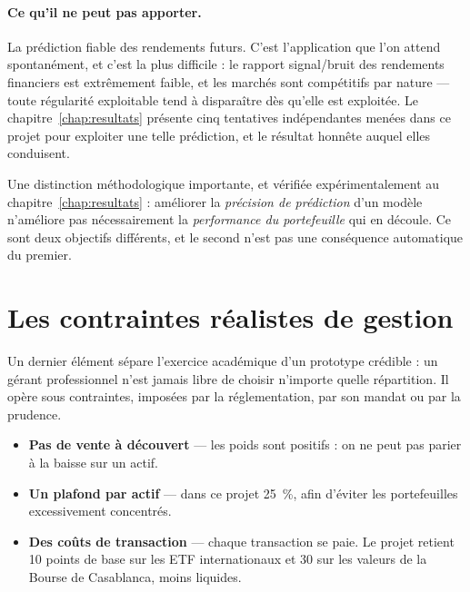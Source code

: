 \paragraph{Ce qu'il ne peut pas apporter.} La prédiction fiable des rendements
futurs. C'est l'application que l'on attend spontanément, et c'est la plus
difficile : le rapport signal/bruit des rendements financiers est extrêmement
faible, et les marchés sont compétitifs par nature — toute régularité exploitable
tend à disparaître dès qu'elle est exploitée. Le chapitre~\ref{chap:resultats}
présente cinq tentatives indépendantes menées dans ce projet pour exploiter une
telle prédiction, et le résultat honnête auquel elles conduisent.

\begin{remarquebox}
Une distinction méthodologique importante, et vérifiée expérimentalement au
chapitre~\ref{chap:resultats} : améliorer la \emph{précision de prédiction} d'un
modèle n'améliore pas nécessairement la \emph{performance du portefeuille} qui en
découle. Ce sont deux objectifs différents, et le second n'est pas une
conséquence automatique du premier.
\end{remarquebox}

\section{Les contraintes réalistes de gestion}

Un dernier élément sépare l'exercice académique d'un prototype crédible : un gérant
professionnel n'est jamais libre de choisir n'importe quelle répartition. Il
opère sous contraintes, imposées par la réglementation, par son mandat ou par la
prudence.

\begin{itemize}
  \item \textbf{Pas de vente à découvert} — les poids sont positifs : on ne peut
        pas parier à la baisse sur un actif.
  \item \textbf{Un plafond par actif} — dans ce projet 25~\%, afin d'éviter les
        portefeuilles excessivement concentrés.
  \item \textbf{Des coûts de transaction} — chaque transaction se paie. Le projet
        retient 10 points de base sur les ETF internationaux et 30 sur les valeurs
        de la Bourse de Casablanca, moins liquides.
\end{itemize}

